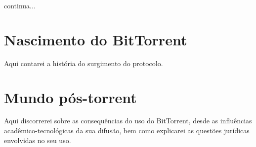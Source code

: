 \begin{comment}
\todo{revisar}

O sucesso do Napster, mesmo que por curto período tempo, mostrou a eficiência que redes
P2P poderiam ter, e com isso novos softwares e modelos de redes foram sendo lançados,
porém tentando contornar o ponto fraco do antecessor a fim de não serem novos alvos de
medidas judiciais. A solução para isso foi tentar descentralizar o mecanismo de indexação
e busca, que foi o calcanhar de Aquiles do Napster.

A pioneira nessa tentativa foi a rede Gnutella, que foi lançada em 2003 mas que em sua
primeira versão não conseguiu manter o bom desempenho do Napster. A busca era demorada e
inconsistente, pois era repassada aleatória e finitamente de peers para seus izinhos, o
que podia terminar em buscas sem resultados mesmo quando um arquivo estava sendo
compartilhado por alguém conectado à rede.
\end{comment}

continua...

\section{Nascimento do BitTorrent}

Aqui contarei a história do surgimento do protocolo.

\section{Mundo pós-torrent}

Aqui discorrerei sobre as consequências do uso do BitTorrent, desde as influências acadêmico-tecnológicas da sua difusão, bem como explicarei as questões jurídicas envolvidas no seu uso.

\clearpage
